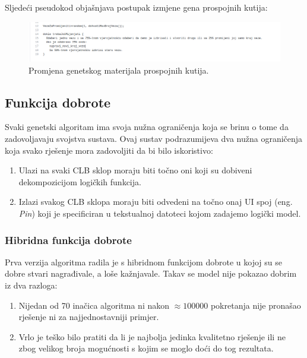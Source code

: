 \documentclass[times, utf8, zavrsni]{fer}
\begin{document}
	Sljedeći pseudokod objašnjava postupak izmjene gena prospojnih kutija: 
	
	\begin{figure}[H]
		\centering
		\includegraphics[width=18cm]{slike/pseudokod.png}
		\caption{Promjena genetskog materijala prospojnih kutija.}
		\label{fig:pseudokod-prospojne}
	\end{figure} 
	
	\subsection{Funkcija dobrote}
	
	Svaki genetski algoritam ima svoja nužna ograničenja koja se brinu o tome da zadovoljavaju svojstva sustava. Ovaj sustav podrazumijeva dva nužna ograničenja koja svako rješenje mora zadovoljiti da bi bilo iskoristivo:
	
	\begin{enumerate}
		\item Ulazi na svaki CLB sklop moraju biti točno oni koji su dobiveni dekompozicijom logičkih funkcija.
		\item Izlazi svakog CLB sklopa moraju biti odvedeni na točno onaj UI spoj (eng. \emph{Pin}) koji je specificiran u tekstualnoj datoteci kojom zadajemo logički model.
	\end{enumerate}
	
	\subsubsection{Hibridna funkcija dobrote}
	
	Prva verzija algoritma radila je s hibridnom funkcijom dobrote u kojoj su se dobre stvari nagrađivale, a loše kažnjavale. Takav se model nije pokazao dobrim iz dva razloga:
	\begin{enumerate}
		\item Nijedan od 70 inačica algoritma ni nakon $\approx100000$ pokretanja nije pronašao rješenje ni za najjednostavniji primjer.
		\item Vrlo je teško bilo pratiti da li je najbolja jedinka kvalitetno rješenje ili ne zbog velikog broja mogućnosti s kojim se moglo doći do tog rezultata. 
	\end{enumerate}
	
\end{document}
